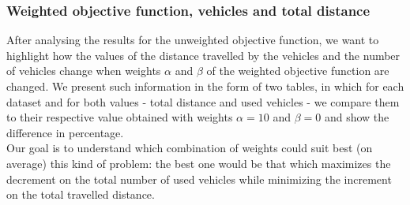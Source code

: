 \subsubsection{Weighted objective function, vehicles and total distance}
\label{subsubsec:distance-vehicles-weighted-obj-fun}
After analysing the results for the unweighted objective function, we want to highlight how the values of the distance travelled by the vehicles and the number of vehicles change when weights $\alpha$ and $\beta$ of the weighted objective function are changed.
We present such information in the form of two tables, in which for each dataset and for both values - total distance and used vehicles - we compare them to their respective value obtained with weights $\alpha=10$ and $\beta=0$ and show the difference in percentage.\\
Our goal is to understand which combination of weights could suit best (on average) this kind of problem: the best one would be that which maximizes the decrement on the total number of used vehicles while minimizing the increment on the total travelled distance.
